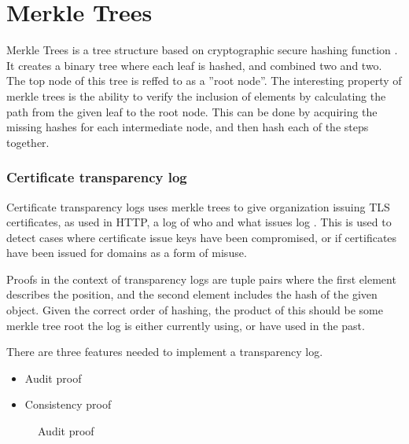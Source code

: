 \documentclass[../Main/thesis.tex]{subfiles}
\begin{document}
\section{Merkle Trees}
Merkle Trees is a tree structure based on cryptographic secure hashing function
\cite{ralph-c.-merkle-1998}. It creates a binary tree where each leaf is hashed,
and combined two and two. The top node of this tree is reffed to as a ''root
node''. The interesting property of merkle trees is the ability to verify the
inclusion of elements by calculating the path from the given leaf to the root
node. This can be done by acquiring the missing hashes for each intermediate
node, and then hash each of the steps together.

\subsubsection*{Certificate transparency log}

Certificate transparency logs uses merkle trees to give organization issuing
TLS certificates, as used in HTTP, a log of who and what issues
log \cite{b.-laurie-a.-langley-e.kaster-google-2013}. This is used to detect
cases where certificate issue keys have been compromised, or if certificates
have been issued for domains as a form of misuse.

Proofs in the context of transparency logs are tuple pairs where the first
element describes the position, and the second element includes the hash of
the given object. Given the correct order of hashing, the product of this
should be some merkle tree root the log is either currently using, or have
used in the past.

There are three features needed to implement a transparency log.

\begin{itemize}
\item Audit proof
\item Consistency proof
\end{itemize}

\begin{figure}[H]
\centering
{}%
\qquad
{}%
\caption{Audit proof}
\label{fig:audit}
\end{figure}
\end{document}
